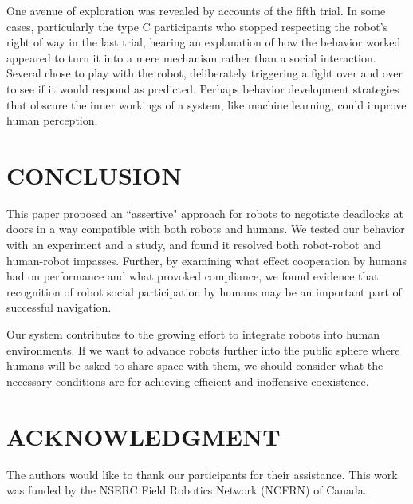 \documentclass[letterpaper, 10 pt, conference]{ieeeconf}  %
\begin{document}
One avenue of exploration was revealed by accounts of the fifth trial. In some cases, particularly the type C participants who stopped respecting the robot's right of way in the last trial, hearing an explanation of how the behavior worked appeared to turn it into a mere mechanism rather than a social interaction. Several chose to play with the robot, deliberately triggering a fight over and over to see if it would respond as predicted. Perhaps behavior development strategies that obscure the inner workings of a system, like machine learning, could improve human perception.

\section{CONCLUSION}

This paper proposed an ``assertive" approach for robots to negotiate deadlocks at doors in a way compatible with both robots and humans. We tested our behavior with an experiment and a study, and found it resolved both robot-robot and human-robot impasses. Further, by examining what effect cooperation by humans had on performance and what provoked compliance, we found evidence that recognition of robot social participation by humans may be an important part of successful navigation.

Our system contributes to the growing effort to integrate robots into human environments. If we want to advance robots further into the public sphere where humans will be asked to share space with them, we should consider what the necessary conditions are for achieving efficient and inoffensive coexistence.

\section*{ACKNOWLEDGMENT}

The authors would like to thank our participants for their assistance. This work was funded by the NSERC Field Robotics Network (NCFRN) of Canada.




\end{document}
